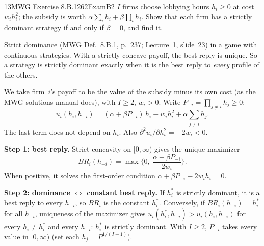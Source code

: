 \begin{exsol}{13}{MWG Exercise 8.B.1}{262}{Exam}{B2}
\asked $I$ firms choose lobbying hours $h_i \ge 0$ at cost $w_i h_i^2$; the subsidy is worth
$\alpha \sum_i h_i + \beta \prod_i h_i$. Show that each firm has a strictly dominant strategy if
and only if $\beta = 0$, and find it.

\method Strict dominance (MWG Def.~8.B.1, p.~237; Lecture~1, slide~23) in a game with
continuous strategies. With a strictly concave payoff, the best reply is unique. So a strategy
is strictly dominant exactly when it is the best reply to \emph{every} profile of the others.

\solution
We take firm~$i$'s payoff to be the value of the subsidy minus its own cost (as the MWG
solutions manual does), with $I \ge 2$, $w_i > 0$. Write $P_{-i} = \prod_{j\ne i} h_j \ge 0$:
\[
  u_i(h_i, h_{-i}) = (\alpha + \beta P_{-i})\, h_i - w_i h_i^2 + \alpha \textstyle\sum_{j\ne i} h_j .
\]
The last term does not depend on $h_i$. Also $\partial^2 u_i/\partial h_i^2 = -2w_i < 0$.

\textbf{Step 1: best reply.} Strict concavity on $[0, \infty)$ gives the unique maximizer
\[
  BR_i(h_{-i}) = \max\Big\{0,\ \frac{\alpha + \beta P_{-i}}{2 w_i}\Big\}.
\]
When positive, it solves the first-order condition $\alpha + \beta P_{-i} - 2 w_i h_i = 0$.

\textbf{Step 2: dominance $\Leftrightarrow$ constant best reply.} If $h_i^*$ is strictly dominant,
it is a best reply to every $h_{-i}$, so $BR_i$ is the constant $h_i^*$. Conversely, if
$BR_i(h_{-i}) = h_i^*$ for all $h_{-i}$, uniqueness of the maximizer gives
$u_i(h_i^*, h_{-i}) > u_i(h_i, h_{-i})$ for every $h_i \ne h_i^*$ and every $h_{-i}$: $h_i^*$ is
strictly dominant. With $I \ge 2$, $P_{-i}$ takes every value in $[0,\infty)$ (set each
$h_j = P^{1/(I-1)}$).


\end{exsol}
